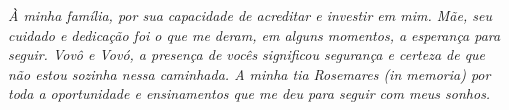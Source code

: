 \vspace*{\fill}

{ \raggedleft


\singlespacing\textit{À minha família, por sua capacidade de acreditar e investir em mim. Mãe, seu cuidado e dedicação foi o que me deram, em alguns momentos, a esperança para seguir. Vovô e Vovó, a presença de vocês significou segurança e certeza de que não estou sozinha nessa caminhada. A minha tia Rosemares (in memoria) por toda a oportunidade e ensinamentos que me deu para seguir com meus sonhos.}

~
}
